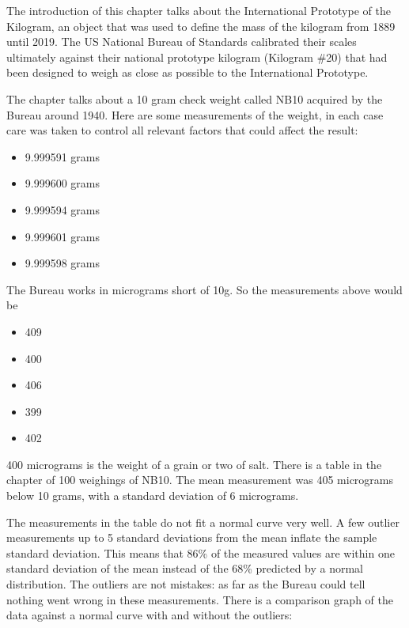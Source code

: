 \documentclass[
]{book}
\providecommand{\tightlist}{%
  \setlength{\itemsep}{0pt}\setlength{\parskip}{0pt}}
\begin{document}
The introduction of this chapter talks about the International Prototype of the Kilogram, an object that was used to define the mass of the kilogram from 1889 until 2019. The US National Bureau of Standards calibrated their scales ultimately against their national prototype kilogram (Kilogram \#20) that had been designed to weigh as close as possible to the International Prototype.

The chapter talks about a 10 gram check weight called NB10 acquired by the Bureau around 1940. Here are some measurements of the weight, in each case care was taken to control all relevant factors that could affect the result:

\begin{itemize}
\tightlist
\item
  9.999591 grams
\item
  9.999600 grams
\item
  9.999594 grams
\item
  9.999601 grams
\item
  9.999598 grams
\end{itemize}

The Bureau works in micrograms short of 10g. So the measurements above would be

\begin{itemize}
\tightlist
\item
  409
\item
  400
\item
  406
\item
  399
\item
  402
\end{itemize}

400 micrograms is the weight of a grain or two of salt. There is a table in the chapter of 100 weighings of NB10. The mean measurement was 405 micrograms below 10 grams, with a standard deviation of 6 micrograms.

The measurements in the table do not fit a normal curve very well. A few outlier measurements up to 5 standard deviations from the mean inflate the sample standard deviation. This means that 86\% of the measured values are within one standard deviation of the mean instead of the 68\% predicted by a normal distribution. The outliers are not mistakes: as far as the Bureau could tell nothing went wrong in these measurements. There is a comparison graph of the data against a normal curve with and without the outliers:
\end{document}
